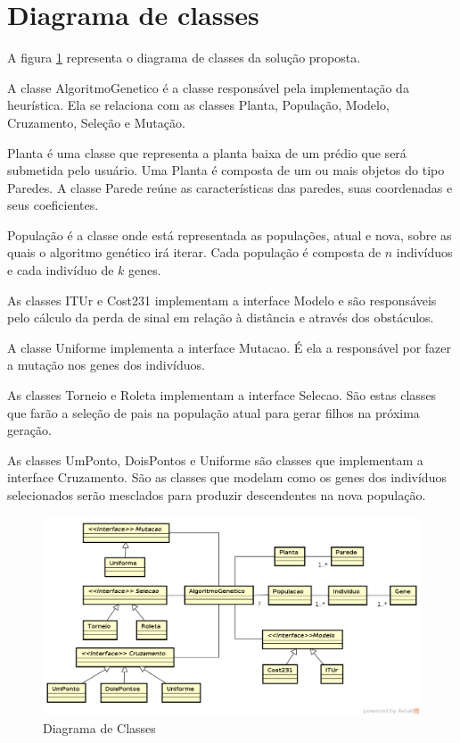 \documentclass[tc,twoside]{iiufrgs}
\begin{document}
\section{Diagrama de classes}

A figura \ref{fig:diagramaDeClasses} representa o diagrama de classes da solução proposta. 

A classe AlgoritmoGenetico é a classe responsável pela implementação da heurística. Ela se relaciona com as classes Planta, População, Modelo, Cruzamento, Seleção e Mutação.

Planta é uma classe que representa a planta baixa de um prédio que será submetida pelo usuário. Uma Planta é composta de um ou mais objetos do tipo Paredes. A classe Parede reúne as características das paredes, suas coordenadas e seus coeficientes. 

População é a classe onde está representada as populações, atual e nova, sobre as quais o algoritmo genético irá iterar. Cada população é composta de $n$ indivíduos e cada indivíduo de $k$ genes. 

As classes ITUr e Cost231 implementam a interface Modelo e são responsáveis pelo cálculo da perda de sinal em relação à distância e através dos obstáculos.

A classe Uniforme implementa a interface Mutacao. É ela a responsável por fazer a mutação nos genes dos indivíduos.

As classes Torneio e Roleta implementam a interface Selecao. São estas classes que farão a seleção de pais na população atual para gerar filhos na próxima geração.

As classes UmPonto, DoisPontos e Uniforme são classes que implementam a interface Cruzamento. São as classes que modelam como os genes dos indivíduos selecionados serão mesclados para produzir descendentes na nova população. 

\begin{figure}[h]
\centering
\includegraphics[scale=0.5]{img/diagramaDeClasses.png}
\caption{Diagrama de Classes}
\label{fig:diagramaDeClasses}
\end{figure}
\end{document}
